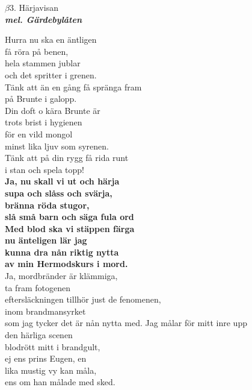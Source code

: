 \documentclass[a6paper,10pt]{article}
\newcommand{\mel}[1]{\small\textbf{\textit{mel. #1 \\}}}
\begin{document}
\setlength{\oddsidemargin}{-0.47in}
\begin{center}
\Large $\beta3$. Härjavisan \\ 
\mel{Gärdebylåten}
\end{center}
\small Hurra nu ska en äntligen \\få röra på benen,\\
hela stammen jublar \\och det spritter i grenen.\\
Tänk att än en gång få spränga fram \\på Brunte i galopp.
\vspace{5pt}\\
Din doft o kära Brunte är \\trots brist i hygienen\\
för en vild mongol\\ minst lika ljuv som syrenen.\\
Tänk att på din rygg få rida runt \\i stan och spela topp! 
\vspace{5pt}\\
\textbf{Ja, nu skall vi ut och härja\\
supa och slåss och svärja,\\
bränna röda stugor,\\
slå små barn och säga fula ord\\
Med blod ska vi stäppen färga\\
nu änteligen lär jag\\
kunna dra nån riktig nytta \\
av min Hermodskurs i mord. }
\vspace{5pt}\\
Ja, mordbränder är klämmiga, \\ta fram fotogenen\\
eftersläckningen tillhör just de fenomenen,\\
inom brandmansyrket \\som jag tycker det är nån nytta med.
\newpage 
\setlength{\oddsidemargin}{-0.37in}
\noindent
Jag målar för mitt inre upp \\den härliga scenen\\
blodrött mitt i brandgult, \\ej ens prins Eugen, en\\
lika mustig vy kan måla, \\ens om han målade med sked.
\vspace{5pt}\\
\end{document}
